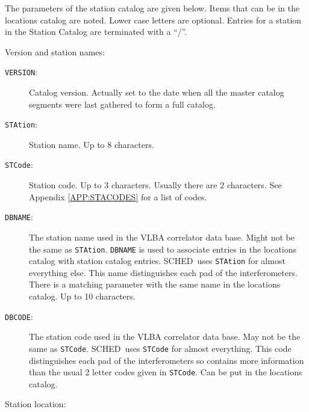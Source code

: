 \documentclass{report}
\newcommand{\schedb}{{\sc SCHED~}}
\begin{document}
The parameters of the station catalog are given below.  Items that can
be in the locations catalog are noted.  Lower case letters are
optional.  Entries for a station in the Station Catalog are terminated with
a ``/''.

Version and station names:

\begin{description}

\item [{\tt VERSION}:] Catalog version.  Actually set to the date when
all the master catalog segments were last gathered to form a full catalog.

\item [{\tt STAtion}:] Station name. Up to 8 characters.

\item [{\tt STCode}:] Station code. Up to 3 characters.  Usually there
are 2 characters.  See Appendix \ref{APP:STACODES} for a list
of codes.

\item [{\tt DBNAME}:] The station name used in the VLBA correlator
data base.  Might not be the same as {\tt STAtion}.  {\tt DBNAME} is
used to associate entries in the locations catalog with station
catalog entries.  \schedb uses {\tt STAtion} for almost everything
else.  This name distinguishes each pad of the interferometers.
There is a matching parameter with the same name in the locations
catalog.  Up to 10 characters.

\item [{\tt DBCODE}:] The station code used in the VLBA correlator
data base.  May not be the same as {\tt STCode}.  \schedb uses
{\tt STCode} for almost everything.  This code distinguishes each
pad of the interferometers so contains more information than the
usual 2 letter codes given in {\tt STCode}.  Can be put in the
locations catalog.

\end{description}

Station location:
\end{document}
